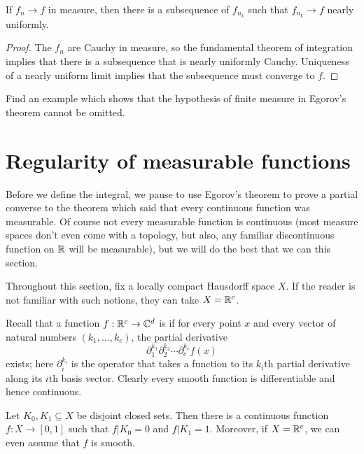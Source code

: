 \begin{corollary}
If $f_n \to f$ in measure, then there is a subsequence of $f_{n_k}$ such that $f_{n_k} \to f$ nearly uniformly.
\end{corollary}
\begin{proof}
The $f_n$ are Cauchy in measure, so the fundamental theorem of integration implies that there is a subsequence that is nearly uniformly Cauchy.
Uniqueness of a nearly uniform limit implies that the subsequence must converge to $f$.
\end{proof}

\begin{exercise}
Find an example which shows that the hypothesis of finite measure in Egorov's theorem cannot be omitted.
\end{exercise}

\section{Regularity of measurable functions}
Before we define the integral, we pause to use Egorov's theorem to prove a partial converse to the theorem which said that every continuous function was measurable.
Of course not every measurable function is continuous (most measure spaces don't even come with a topology, but also, any familiar discontinuous function on $\mathbb{R}$ will be measurable), but we will do the best that we can this section.

\begin{subsec}
Throughout this section, fix a locally compact Hausdorff space $X$. If the reader is not familiar with such notions, they can take $X = \mathbb{R}^c$.
\end{subsec}

\begin{subsec}
Recall that a function $f: \mathbb{R}^c \to \mathbb{C}^d$ is  if for every point $x$ and every vector of natural numbers $(k_1, \dots, k_c)$, the partial derivative
\[\partial_1^{k_1} \partial_2^{k_2} \cdots \partial_c^{k_c} f(x)\]
exists; here $\partial_i^{k_i}$ is the operator that takes a function to its $k_i$th partial derivative along its $i$th basis vector.
Clearly every smooth function is differentiable and hence continuous.
\end{subsec}

\begin{lemma}[Urysohn]
Let $K_0,K_1 \subseteq X$ be disjoint closed sets. Then there is a continuous function $f: X \to [0, 1]$ such that $f|K_0 = 0$ and $f|K_1 = 1$.
Moreover, if $X = \mathbb{R}^c$, we can even assume that $f$ is smooth.
\end{lemma}

